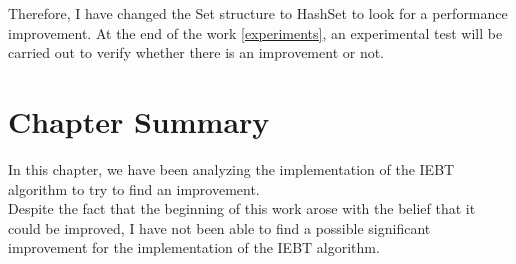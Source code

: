 Therefore, I have changed the Set structure to HashSet to look for a performance improvement.
At the end of the work \ref{experiments}, an experimental test will be carried out to verify whether there is an improvement or not.

\section{Chapter Summary}
In this chapter, we have been analyzing the implementation of the IEBT algorithm to try to find an improvement. \\
Despite the fact that the beginning of this work arose with the belief that it could be improved, I have not been able to find a possible significant improvement for the implementation of the IEBT algorithm.
